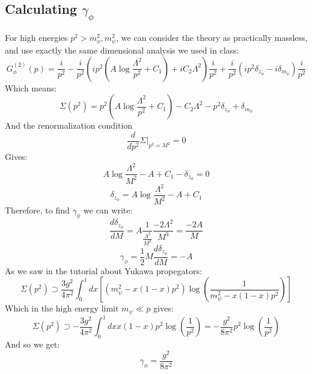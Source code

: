 \documentclass{article}
\begin{document}
\subsection{Calculating $\gamma_\phi$}
For high energies $p^2 > m_\phi^2, m_\psi^2$, we can consider the theory as practically massless, and use exactly the same dimensional analysis we used in class:
\begin{equation}
    G^{(2)}_\phi(p) = \frac{i}{p^2} - \frac{i}{p^2}\left(ip^2 \left(A \log\frac{\Lambda^2}{p^2} + C_1\right) + iC_2\Lambda^2\right)\frac{i}{p^2} + \frac{i}{p^2}\left(ip^2\delta_{z_\phi} - i\delta_{m_\phi}\right)\frac{i}{p^2}
\end{equation}
Which means:
\begin{equation}
    \Sigma\left(p^2\right) = p^2 \left(A \log\frac{\Lambda^2}{p^2} + C_1\right) - C_2\Lambda^2 - p^2\delta_{z_\phi} + \delta_{m_\phi}
\end{equation}
And the renormalization condition
\begin{equation}
    \frac{d}{dp^2}\Sigma \Bigg|_{p^2 = M^2} = 0
\end{equation}
Gives:
\begin{equation}
    A \log\frac{\Lambda^2}{M^2} - A + C_1 - \delta_{z_\phi} = 0
\end{equation}
\begin{equation}
    \delta_{z_\phi} = A \log\frac{\Lambda^2}{M^2} - A + C_1
\end{equation}
Therefore, to find $\gamma_\phi$ we can write:
\begin{equation}
    \frac{d\delta_{z_\phi}}{dM} = A\frac{1}{\frac{\Lambda^2}{M^2}}\frac{-2\Lambda^2}{M^3} = \frac{-2A}{M}
\end{equation}
\begin{equation}
    \gamma_\phi = \frac{1}{2}M\frac{d\delta_{z_\phi}}{dM} = -A
\end{equation}
As we saw in the tutorial about Yukawa propegators:
\begin{equation}
    \Sigma(p^2) \supset
    \frac{3g^2}{4\pi^2} \int_0^1 dx \left[
        \left(m_\psi^2 - x(1 - x)p^2\right)
        \log\left(\frac{1}{m_\psi^2 - x(1 - x)p^2}\right)
    \right]
\end{equation}
Which in the high energy limit $m_\psi \ll p$ gives:
\begin{equation}
    \Sigma(p^2) \supset
    - \frac{3g^2}{4\pi^2} \int_0^1 dx 
        x(1 - x)p^2
        \log\left(\frac{1}{p^2}\right) = - \frac{g^2}{8\pi^2}p^2
        \log\left(\frac{1}{p^2}\right)
\end{equation}
And so we get:
\begin{equation}
    \gamma_\phi = \frac{g^2}{8\pi^2}
\end{equation}
\end{document}
